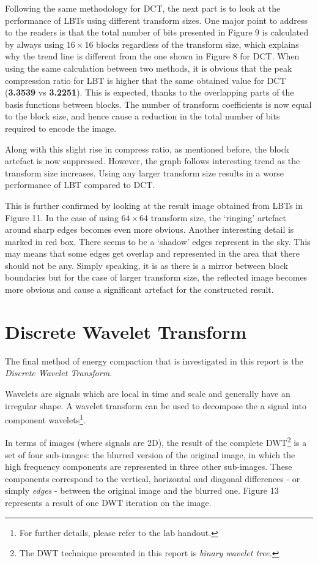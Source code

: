 \documentclass[a4paper, 11pt]{article}
\begin{document}
Following the same methodology for DCT, the next part is to look at the performance of LBTs using different transform sizes. One major point to address to the readers is that the total number of bits presented in Figure 9 is calculated by always using $16 \times 16$ blocks regardless of the transform size, which explains why the trend line is different from the one shown in Figure 8 for DCT. When using the same calculation between two methods, it is obvious that the peak compression ratio for LBT is higher that the same obtained value for DCT (\textbf{3.3539} vs \textbf{3.2251}). This is expected, thanks to the overlapping parts of the basis functions between blocks. The number of transform coefficients is now equal to the block size, and hence cause a reduction in the total number of bits required to encode the image.

Along with this slight rise in compress ratio, as mentioned before, the block artefact is now suppressed. However, the graph follows interesting trend as the transform size increases. Using any larger transform size results in a worse performance of LBT compared to DCT. 

This is further confirmed by looking at the result image obtained from LBTs in Figure 11. In the case of using $64 \times 64$ transform size, the `ringing' artefact around sharp edges becomes even more obvious. Another interesting detail is marked in red box. There seems to be a `shadow' edges represent in the sky. This may means that some edges get overlap and represented in the area that there should not be any. Simply speaking, it is as there is a mirror between block boundaries but for the case of larger transform size, the reflected image becomes more obvious and cause a significant artefact for the constructed result. 

\section{Discrete Wavelet Transform}
The final method of energy compaction that is investigated in this report is the \textit{Discrete Wavelet Transform.}

Wavelets are signals which are local in time and scale and generally have an irregular shape. A wavelet transform can be used to decompose the a signal into component wavelets\footnote{For further details, please refer to the lab handout.}.

In terms of images (where signals are 2D), the result of the complete DWT\footnote{The DWT technique presented in this report is \textit{binary wavelet tree.}} is a set of four sub-images: the blurred version of the original image, in which the high frequency components are represented in three other sub-images. These components correspond to the vertical, horizontal and diagonal differences - or simply \textit{edges} - between the original image and the blurred one. Figure 13 represents a result of one DWT iteration on the image. 
\end{document}
